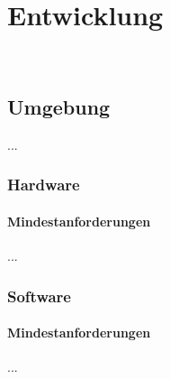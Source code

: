 %
%


\chapter{Entwicklung}
\label{EW}~\\


\section{Umgebung}
\label{EW:Umgebung}

...
\\


\subsection{Hardware}


\subsubsection*{Mindestanforderungen}

...
\\


\subsection{Software}

\subsubsection*{Mindestanforderungen}

...
\\



%



